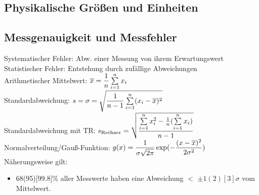 \documentclass[fs, footer]{latex4ei}
\begin{document}
\vspace*{-10mm} %
\begin{multicols*}{4}



\iffalse
	\emphbox{
	\textbf{Wichtiger Hinweis}
	\\ Diese Formelsammlung ist noch in der Entwicklung und nicht prüfungstauglich ! \\ Allerdings würden wir uns über Unterstützung freuen das zu ändern. Wer Lust hat kann uns über das Kontaktformular auf www.latex4ei.de erreichen.
	}\fi
\section{Physikalische Größen und Einheiten}

\subsection{Messgenauigkeit und Messfehler}
Systematischer Fehler: Abw. einer Messung von ihrem Erwartungswert\\
Statistischer Fehler: Entstehung durch zufällige Abweichungen\\
Arithmetischer Mittelwert: $\ol x = \fr{1}{n}\sum_{i=1}^n x_i$\\
Standardabweichung: $s = \sigma = \sqrt{\fr{1}{n-1}\sum_{i=1}^n (x_i-\ol x)^2}$\\
Standardabweichung mit TR: $s_{\text{Rechner}} = \sqrt{ \fr{\sum_{i=1}^n x_i^2 - \frac{1}{n} (\sum_{i=1}^n x_i)}{n-1} }$\\
Normalverteilung/Gauß-Funktion: $g(x) = \dfrac{1}{\sigma \sqrt{2\pi}}\exp(-\dfrac{(x-\overline{x})^2}{2\sigma^2})$\\
Näherungsweise gilt: 
\begin{itemize}
\item 68(95)[99.8]\% aller Messwerte haben eine Abweichung $<$ $\pm 1(2)[3]\sigma$ vom Mittelwert.
\end{itemize}



\end{multicols*}
\end{document}
